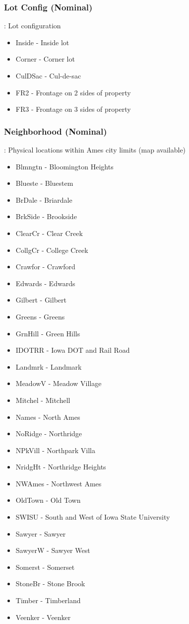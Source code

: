 \documentclass[sigconf]{acmart}
\begin{document}
	\subsubsection{Lot Config (Nominal)}: Lot configuration
	\begin{itemize}
		\item  Inside - Inside lot
		\item  Corner - Corner lot
		\item  CulDSac - Cul-de-sac
		\item  FR2 - Frontage on 2 sides of property
		\item  FR3 - Frontage on 3 sides of property
	\end{itemize}
	
	\subsubsection{Neighborhood (Nominal)}: Physical locations within Ames city limits (map available)
	\begin{itemize}
		\item  Blmngtn - Bloomington Heights
		\item  Blueste - Bluestem
		\item  BrDale - Briardale
		\item  BrkSide - Brookside
		\item  ClearCr - Clear Creek
		\item  CollgCr - College Creek
		\item  Crawfor - Crawford
		\item  Edwards - Edwards
		\item  Gilbert - Gilbert
		\item  Greens - Greens
		\item  GrnHill - Green Hills
		\item  IDOTRR - Iowa DOT and Rail Road
		\item  Landmrk - Landmark
		\item  MeadowV - Meadow Village
		\item  Mitchel - Mitchell
		\item  Names - North Ames
		\item  NoRidge - Northridge
		\item  NPkVill - Northpark Villa
		\item  NridgHt - Northridge Heights
		\item  NWAmes - Northwest Ames
		\item  OldTown - Old Town
		\item  SWISU - South and West of Iowa State University
		\item  Sawyer - Sawyer
		\item  SawyerW - Sawyer West
		\item  Somerst - Somerset
		\item  StoneBr - Stone Brook
		\item  Timber - Timberland
		\item  Veenker - Veenker
	\end{itemize}
\end{document}
